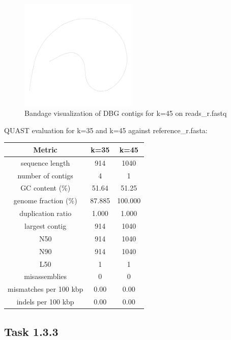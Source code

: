 \documentclass[12pt]{article}
\begin{document}
\begin{figure}[h]
    \centering
    \includegraphics[width=0.5\textwidth]{../toy_dataset/r-k-45.png}
    \caption{Bandage visualization of DBG contigs for k=45 on reads\_r.fastq}
\end{figure} 

QUAST evaluation for k=35 and k=45 against reference\_r.fasta:

\begin{center}
\begin{tabular}{ |c|c|c| }
    \hline
    Metric & k=35 & k=45 \\
    \hline
    sequence length & 914 & 1040 \\
    number of contigs & 4 & 1 \\
    GC content (\%) & 51.64 & 51.25 \\
    genome fraction (\%) & 87.885 & 100.000 \\
    duplication ratio & 1.000 & 1.000 \\
    largest contig & 914 & 1040 \\
    N50 & 914 & 1040 \\
    N90 & 914 & 1040 \\
    L50 & 1 & 1 \\
    misassemblies & 0 & 0 \\
    mismatches per 100 kbp & 0.00 & 0.00 \\
    indels per 100 kbp & 0.00 & 0.00 \\
    \hline
\end{tabular}
\end{center}


\subsection{Task 1.3.3}
\end{document}
